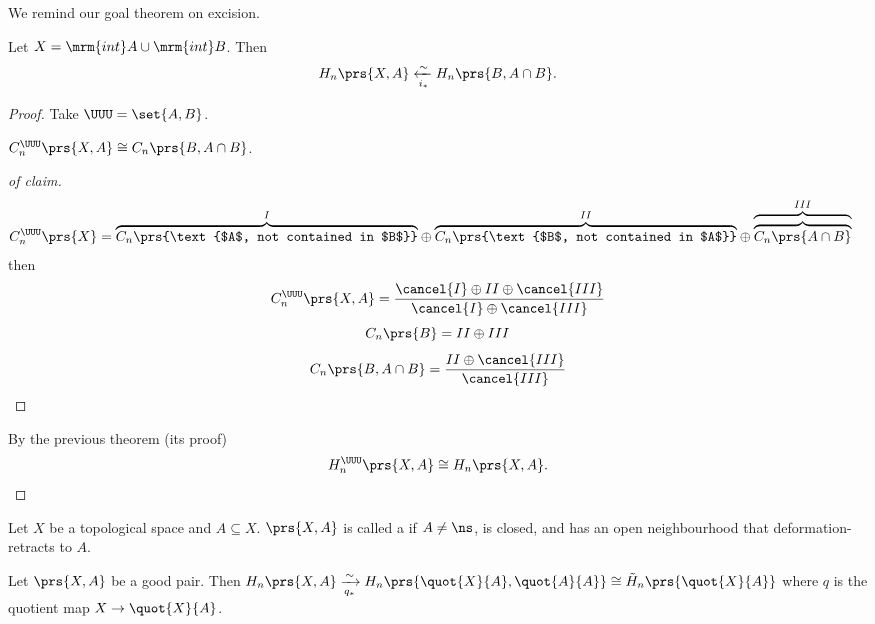 \documentclass[10pt,a4paper,twoside,openany,hidelinks]{book}
\begin{document}

We remind our goal theorem on excision.

\begin{theorem}[excision]
Let $X = \mrm{int} A \cup \mrm{int} B$. Then \[H_n\prs{X,A} \xleftarrow[i_*]{\sim} H_n\prs{B, A \cap B}\text{.}\]
\end{theorem}
\begin{proof}
Take $\UUU = \set{A,B}$.
\begin{claim}
$C_n^{\UUU}\prs{X,A} \cong C_n\prs{B,A\cap B}$.
\end{claim}
\begin{proof}[of claim]
\begin{align*}
C_n^{\UUU}\prs{X} &= \overset{I}{\overbrace{C_n\prs{\text{$A$, not contained in $B$}}}} \oplus \overset{II}{\overbrace{C_n\prs{\text{$B$, not contained in $A$}}}} \oplus \overset{III}{\overbrace{\overbrace{C_n\prs{A \cap B}}}}
\end{align*}
then
\[C_n^{\UUU}\prs{X,A} = \frac{\cancel{I} \oplus II \oplus \cancel{III}}{\cancel{I} \oplus \cancel{III}}\]
\[C_n\prs{B} = II \oplus III\]
\[C_n\prs{B, A \cap B} = \frac{II \oplus \cancel{III}}{\cancel{III}}\]
\end{proof}
By the previous theorem (its proof)
\[H_n^{\UUU}\prs{X,A} \cong H_n\prs{X,A}\text{.}\]
\end{proof}
\begin{definition}
Let $X$ be a topological space and $A \subseteq X$. $\prs{X,A}$ is called a  if $A \neq \ns$, is closed, and has an open neighbourhood that deformation-retracts to $A$.
\end{definition}
\begin{theorem}
Let $\prs{X,A}$ be a good pair. Then $H_n\prs{X,A} \xrightarrow[q_*]{\sim} H_n\prs{\quot{X}{A}, \quot{A}{A}} \cong \tilde{H}_n\prs{\quot{X}{A}}$ where $q$ is the quotient map $X \to \quot{X}{A}$.
\end{theorem}
\end{document}
